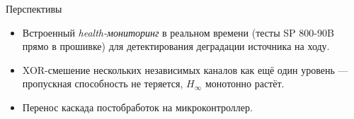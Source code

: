 \documentclass[14pt,aspectratio=169]{beamer}
\begin{document}
\begin{frame}{Перспективы}
  \begin{itemize}
    \setlength{\itemsep}{0.7em}
    \item Встроенный \emph{health-мониторинг} в реальном времени (тесты SP 800-90B прямо в прошивке) для детектирования деградации источника на ходу.
    \item XOR-смешение нескольких независимых каналов как ещё один уровень --- пропускная способность не теряется, $H_\infty$ монотонно растёт.
    \item Перенос каскада постобработок на микроконтроллер.
  \end{itemize}
\end{frame}
\end{document}
